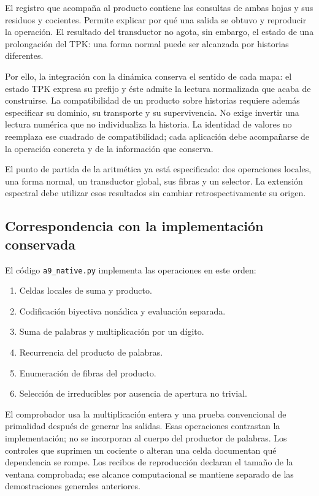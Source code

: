 El registro que acompaña al producto contiene las consultas de ambas hojas y sus residuos y cocientes. Permite explicar por qué una salida se obtuvo y reproducir la operación. El resultado del transductor no agota, sin embargo, el estado de una prolongación del TPK: una forma normal puede ser alcanzada por historias diferentes.

Por ello, la integración con la dinámica conserva el sentido de cada mapa: el estado TPK expresa su prefijo y éste admite la lectura normalizada que acaba de construirse. La compatibilidad de un producto sobre historias requiere además especificar su dominio, su transporte y su supervivencia. No exige invertir una lectura numérica que no individualiza la historia. La identidad de valores no reemplaza ese cuadrado de compatibilidad; cada aplicación debe acompañarse de la operación concreta y de la información que conserva.

El punto de partida de la aritmética ya está especificado: dos operaciones locales, una forma normal, un transductor global, sus fibras y un selector. La extensión espectral debe utilizar esos resultados sin cambiar retrospectivamente su origen.

\subsection{Correspondencia con la implementación conservada}
El código \texttt{a9\_\allowbreak{}native.\allowbreak{}py} implementa las operaciones en este orden:

\begin{enumerate}
\item Celdas locales de suma y producto.
\item Codificación biyectiva nonádica y evaluación separada.
\item Suma de palabras y multiplicación por un dígito.
\item Recurrencia del producto de palabras.
\item Enumeración de fibras del producto.
\item Selección de irreducibles por ausencia de apertura no trivial.
\end{enumerate}
El comprobador usa la multiplicación entera y una prueba convencional de primalidad después de generar las salidas. Esas operaciones contrastan la implementación; no se incorporan al cuerpo del productor de palabras. Los controles que suprimen un cociente o alteran una celda documentan qué dependencia se rompe. Los recibos de reproducción declaran el tamaño de la ventana comprobada; ese alcance computacional se mantiene separado de las demostraciones generales anteriores.
